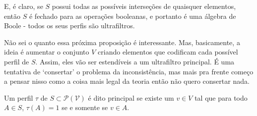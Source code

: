 \documentclass[11pt]{article}
\theoremstyle{definition}
\theoremstyle{definition}
\theoremstyle{definition}
\theoremstyle{definition}
\theoremstyle{definition}
\theoremstyle{definition}
\theoremstyle{definition}
\theoremstyle{definition}
\newtheorem*{definition*}{Definição}
\newenvironment{definicao*}{
\definecolor{shadecolor}{HTML}{defcfc}
\begin{shaded}
\begin{definition*}
}
{
\end{definition*}
\end{shaded}
}
\theoremstyle{definition}
\theoremstyle{definition}
\theoremstyle{definition}
\theoremstyle{definition}
\theoremstyle{definition}
\theoremstyle{definition}
\begin{document}
E, é claro, se $S$ possui todas as possíveis interseções de quaisquer elementos, então $S$ é fechado para as operações booleanas, e portanto é uma álgebra de Boole - todos os seus perfis são ultrafiltros.

Não sei o quanto essa próxima proposição é interessante. Mas, basicamente, a ideia é aumentar o conjunto $V$ criando elementos que codificam cada possível perfil de $S$. Assim, eles vão ser estendíveis a um ultrafiltro principal. É uma tentativa de `consertar' o problema da inconsistência, mas mais pra frente começo a pensar nisso como a coisa mais legal da teoria então não quero consertar nada.

\begin{definicao*}[Principal]
  Um perfil $\tau$ de $S \subset \mathcal{P(V)}$ é dito principal se existe um $v \in V$ tal que para todo $A \in S$, $\tau(A) = 1$ se e somente se $v \in A$. 
\end{definicao*}
\end{document}
